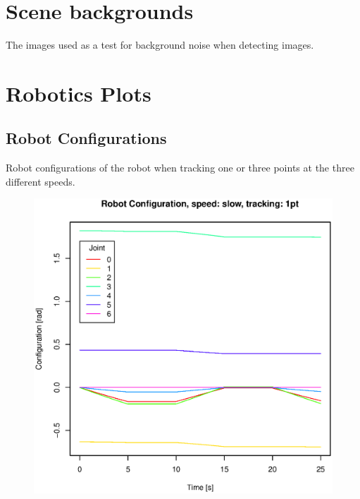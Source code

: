 \section{Scene backgrounds}
\label{app:Scenes}

The images used as a test for background noise when detecting images.


\section{Robotics Plots}
\label{app:roboticsPlots}

\subsection{Robot Configurations}
Robot configurations of the robot when tracking one or three points at the three different speeds.
\begin{figure}[H]
\centering
\includegraphics[width= \linewidth]{graphics/robotics/robotConfiguration_slow_1pt}
\caption{}
\label{fig:}
\end{figure}

